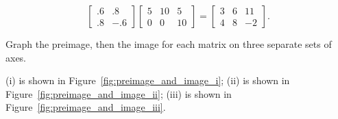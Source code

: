 \documentclass[../gatm_answers.tex]{subfiles}
\begin{document}
$$\begin{bmatrix} .6 & .8 \\ .8 & -.6 \end{bmatrix} \begin{bmatrix} 5 & 10 & 5 \\ 0 & 0 & 10 \end{bmatrix} = \begin{bmatrix} 3 & 6 & 11 \\ 4 & 8 & -2 \end{bmatrix}.$$

\begin{inner_problem}
\item Graph the preimage, then the image for each matrix on three separate sets of axes.
\end{inner_problem}

(i) is shown in Figure~\ref{fig:preimage_and_image_i}; (ii) is shown in Figure~\ref{fig:preimage_and_image_ii}; (iii) is shown in Figure~\ref{fig:preimage_and_image_iii}.
\end{document}
